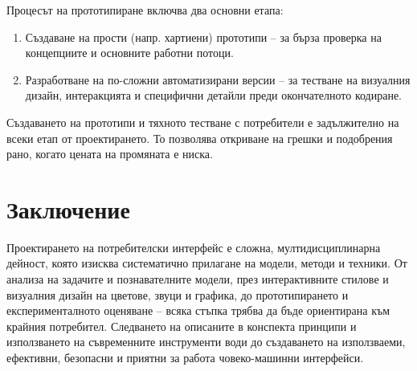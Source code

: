 \documentclass{scrartcl}
\begin{document}
\begin{FlushLeft}
Процесът на прототипиране включва два основни етапа:
\begin{enumerate}
    \item Създаване на прости (напр. хартиени) прототипи – за бърза проверка на концепциите и основните работни потоци.
    \item Разработване на по-сложни автоматизирани версии – за тестване на визуалния дизайн, интеракцията и специфични детайли преди окончателното кодиране.
\end{enumerate}

Създаването на прототипи и тяхното тестване с потребители е задължително на всеки етап от проектирането. То позволява откриване на грешки и подобрения рано, когато цената на промяната е ниска.

\section*{Заключение}

Проектирането на потребителски интерфейс е сложна, мултидисциплинарна дейност, която изисква систематично прилагане на модели, методи и техники. От анализа на задачите и познавателните модели, през интерактивните стилове и визуалния дизайн на цветове, звуци и графика, до прототипирането и експерименталното оценяване – всяка стъпка трябва да бъде ориентирана към крайния потребител. Следването на описаните в конспекта принципи и използването на съвременните инструменти води до създаването на използваеми, ефективни, безопасни и приятни за работа човеко-машинни интерфейси.

\end{FlushLeft}
\end{document}
